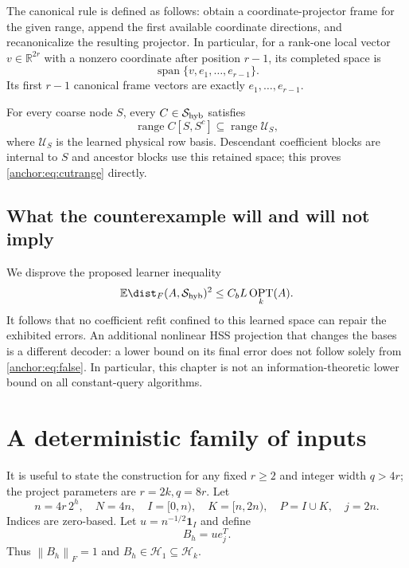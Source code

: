 \documentclass[11pt,oneside,openany,a4paper]{book}
\numberwithin{equation}{chapter}
\theoremstyle{definition}
\theoremstyle{remark}
\newcommand{\R}{\mathbb R}\newcommand{\E}{\mathbb E}\newcommand{\Prb}{\mathbb P}\newcommand{\PP}{\mathbb P}
\newcommand{\F}[1]{\left\lVert#1\right\rVert_F}
\DeclareMathOperator{\ran}{range}\DeclareMathOperator{\OPT}{OPT}
\newcommand{\HH}{\mathcal H}\newcommand{\SSS}{\mathcal S}
\begin{document}
The canonical rule is defined as follows: obtain a coordinate-projector frame for the given range, append the first available coordinate directions, and recanonicalize the resulting projector. In particular, for a rank-one local vector $v\in\R^{2r}$ with a nonzero coordinate after position $r-1$, its completed space is
\begin{equation}\label{anchor:eq:canonical}
 \operatorname{span}\{v,e_1,\ldots,e_{r-1}\}.
\end{equation}
Its first $r-1$ canonical frame vectors are exactly $e_1,\ldots,e_{r-1}$.

For every coarse node $S$, every $C\in\SSS_{\rm hyb}$ satisfies
\begin{equation}\label{anchor:eq:cutrange}
 \ran C[S,S^c]\subseteq\ran\mathcal U_S,
\end{equation}
where $\mathcal U_S$ is the learned physical row basis. Descendant coefficient blocks are internal to $S$ and ancestor blocks use this retained space; this proves \eqref{anchor:eq:cutrange} directly.

\subsection{What the counterexample will and will not imply}
We disprove the proposed learner inequality
\begin{equation}\label{anchor:eq:false}
 \E\dist_F(A,\SSS_{\rm hyb})^2\le C_bL\OPT_k(A).
\end{equation}
It follows that no coefficient refit confined to this learned space can repair the exhibited errors. An additional nonlinear HSS projection that changes the bases is a different decoder: a lower bound on its final error does not follow solely from \eqref{anchor:eq:false}. In particular, this chapter is not an information-theoretic lower bound on all constant-query algorithms.

\section{A deterministic family of inputs}\label{anchor:sec:input}
It is useful to state the construction for any fixed $r\ge2$ and integer width $q>4r$; the project parameters are $r=2k,q=8r$. Let
\[
 n=4r\,2^h,\quad N=4n,\quad
 I=[0,n),\quad K=[n,2n),\quad P=I\cup K,\quad j=2n.
\]
Indices are zero-based. Let $u=n^{-1/2}\mathbf1_I$ and define
\begin{equation}\label{anchor:eq:B}
 B_h=ue_j^T.
\end{equation}
Thus $\F{B_h}=1$ and $B_h\in\HH_1\subseteq\HH_k$.
\end{document}
